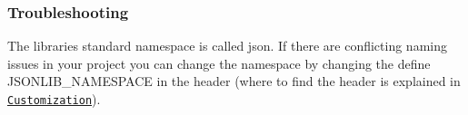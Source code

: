 \subsubsection*{\label{_troubleshooting_section}%
Troubleshooting}


\begin{DoxyItemize}
\item The libraries standard namespace is called {\ttfamily json}. If there are conflicting naming issues in your project you can change the namespace by changing the define {\ttfamily J\+S\+O\+N\+L\+I\+B\+\_\+\+N\+A\+M\+E\+S\+P\+A\+CE} in the header (where to find the header is explained in \href{#customization_section}{\tt Customization}). 
\end{DoxyItemize}